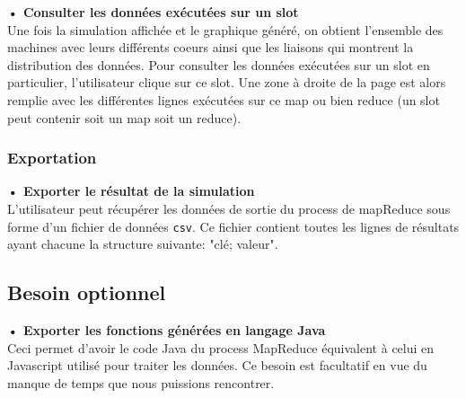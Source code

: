 \textbf{• Consulter les données exécutées sur un slot\\} Une fois la simulation affichée et le graphique généré, on obtient l'ensemble des machines avec leurs différents coeurs ainsi que les liaisons qui montrent la distribution des données. Pour consulter les données exécutées sur un slot en particulier, l'utilisateur clique sur ce slot. Une zone à droite de la page est alors remplie avec les différentes lignes exécutées sur ce map ou bien reduce (un slot peut contenir soit un map soit un reduce).\\ 
 
\subsubsection{Exportation}

\textbf{• Exporter le résultat de la simulation\\} L'utilisateur peut récupérer les données de sortie du process de mapReduce sous forme d'un fichier de données {\tt csv}. Ce fichier contient toutes les lignes de résultats ayant chacune la structure suivante: "clé; valeur".


\subsection{Besoin optionnel}

\textbf{• Exporter les fonctions générées en langage Java\\} Ceci permet d'avoir le code Java du process MapReduce équivalent à celui en Javascript utilisé pour traiter les données. Ce besoin est facultatif en vue du manque de temps que nous puissions rencontrer.

